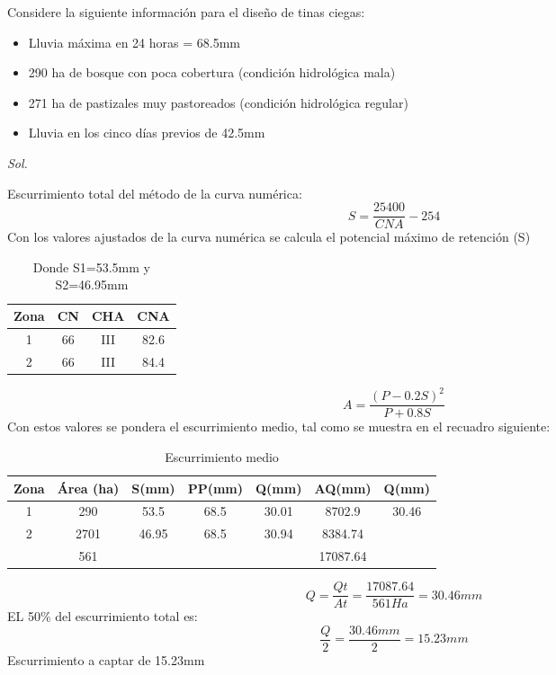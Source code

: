     \begin{example}
        Considere la siguiente información para el diseño de tinas ciegas:
        \begin{itemize}
            \item Lluvia máxima en 24 horas = 68.5mm
            \item 290 ha de bosque con poca cobertura (condición hidrológica mala)
            \item 271 ha de pastizales muy pastoreados (condición hidrológica regular)
            \item Lluvia en los cinco  días previos de 42.5mm
        \end{itemize}
        \textit{ Sol. }
    
        Escurrimiento total del método de la curva numérica:
        \begin{equation*}
            S = \frac{25400}{CNA} - 254
        \end{equation*}
        Con los valores ajustados de la curva numérica se calcula el potencial máximo de retención (S)
        \begin{table}[h!]
            \centering
            \begin{tabular}{@{}cccc@{}}
            \toprule
            Zona & CN & CHA & CNA  \\ \midrule
            1    & 66 & III & 82.6 \\
            2    & 66 & III & 84.4 \\ \bottomrule
            \end{tabular}
            \caption{Donde S1=53.5mm y S2=46.95mm}
            \label{tabcsa16}
            \end{table}
    \begin{equation*}
        A = \frac{(P - 0.2S)^2}{P + 0.8S}
    \end{equation*}
    Con estos valores se pondera el escurrimiento medio, tal como se muestra en el recuadro siguiente:
    \begin{table}[h!]
        \centering
        \begin{tabular}{@{}ccccccc@{}}
        \toprule
        Zona & Área (ha) & S(mm) & PP(mm) & Q(mm) & AQ(mm)   & Q(mm) \\ \midrule
        1    & 290       & 53.5  & 68.5   & 30.01 & 8702.9   & 30.46 \\
        2    & 2701      & 46.95 & 68.5   & 30.94 & 8384.74  &       \\
             & 561       &       &        &       & 17087.64 &       \\ \bottomrule
        \end{tabular}
        \caption{Escurrimiento medio}
        \label{tabcsa17}
        \end{table}
        \begin{equation*}
            Q = \frac{Qt}{At} = \frac{17087.64}{561Ha} = 30.46mm
        \end{equation*}
    EL 50\% del escurrimiento total es:
    \begin{equation*}
        \frac{Q}{2} = \frac{30.46mm}{2} = 15.23mm
    \end{equation*}
    Escurrimiento a captar de 15.23mm
    

\end{example}
